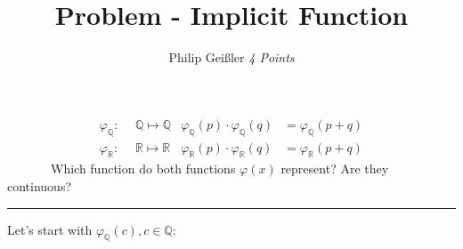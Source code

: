 \documentclass[12pt, a4paper]{article}
\newcommand{\rom}[1]{\uppercase\expandafter{\romannumeral #1\relax}}
\begin{document}
\title{Problem \rom{2} - Implicit Function}
\author{Philip Gei\ss{}ler \hspace{5cm} \textit{{4} Points}}
\date{}
\maketitle
\vspace*{-.9cm}

\begin{align*}
\varphi_\mathbb{Q} :&\mathbb{~~Q} \longmapsto \mathbb{Q} &\varphi_\mathbb{Q}(p)\cdot\varphi_\mathbb{Q}(q) &= \varphi_\mathbb{Q}(p+q)\\
\varphi_\mathbb{R} :&\mathbb{~~R} \longmapsto \mathbb{R} &\varphi_\mathbb{R}(p)\cdot\varphi_\mathbb{R}(q) &= \varphi_\mathbb{R}(p+q)
\end{align*}
~~~~~~~Which function do both functions $\varphi(x)$ represent? Are they continuous? 
\hrule
\vspace*{9mm}
Let's start with $\varphi_\mathbb{Q}(c), c\in\mathbb{Q}$:
\end{document}
